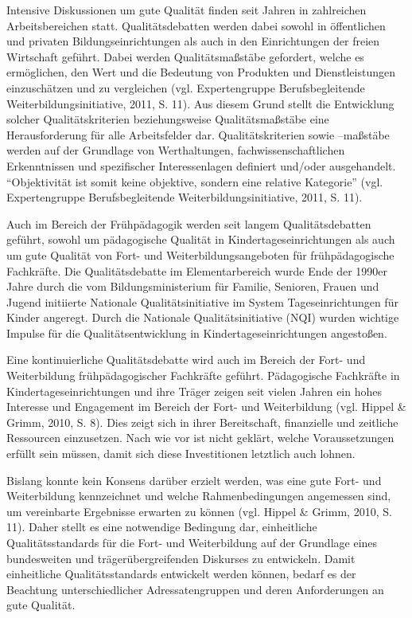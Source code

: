 \documentclass[12pt,a4paper]{article}
\begin{document}
Intensive Diskussionen um gute Qualität finden seit Jahren in zahlreichen Arbeitsbereichen statt. Qualitätsdebatten werden dabei sowohl in öffentlichen und privaten Bildungseinrichtungen als auch in den Einrichtungen der freien Wirtschaft geführt. Dabei werden Qualitätsmaßstäbe gefordert, welche es ermöglichen, den Wert und die Bedeutung von Produkten und Dienstleistungen einzuschätzen und zu vergleichen (vgl. Expertengruppe Berufsbegleitende Weiterbildungsinitiative, 2011, S. 11). Aus diesem Grund stellt die Entwicklung solcher Qualitätskriterien beziehungsweise Qualitätsmaßstäbe eine Herausforderung für alle Arbeitsfelder dar. Qualitätskriterien sowie –maßstäbe werden auf der Grundlage von Werthaltungen, fachwissenschaftlichen Erkenntnissen und spezifischer Interessenlagen definiert und/oder ausgehandelt. "`Objektivität ist somit keine objektive, sondern eine relative Kategorie"' (vgl. Expertengruppe Berufsbegleitende Weiterbildungsinitiative, 2011, S. 11). 

	Auch im Bereich der Frühpädagogik werden seit langem Qualitätsdebatten geführt, sowohl um pädagogische Qualität in Kindertageseinrichtungen als auch um gute Qualität von Fort- und Weiterbildungsangeboten für früh\-pä\-da\-go\-gische Fachkräfte. Die Qualitätsdebatte im Elementarbereich wurde Ende der 1990er Jahre  durch die vom Bildungsministerium für Familie, Senioren, Frauen und Jugend initiierte Nationale Qualitätsinitiative im System Tageseinrichtungen für Kinder angeregt. Durch die Nationale Qualitätsinitiative (NQI) wurden wichtige Impulse für die Qualitätsentwicklung in Kindertageseinrichtungen angestoßen. 
	
	Eine kontinuierliche Qualitätsdebatte wird auch im Bereich der Fort- und Weiterbildung frühpädagogischer Fachkräfte geführt. Pädagogische Fach\-kräf\-te in Kindertageseinrichtungen und ihre Träger zeigen seit vielen Jahren ein hohes Interesse und Engagement im Bereich der Fort- und Weiterbildung (vgl. Hippel \& Grimm, 2010, S. 8). Dies zeigt sich in ihrer Bereitschaft, finanzielle und zeitliche Ressourcen einzusetzen. Nach wie vor ist nicht geklärt, welche Voraussetzungen erfüllt sein müssen, damit sich diese Investitionen letztlich auch lohnen.
	
	Bislang konnte kein Konsens darüber erzielt werden, was eine gute Fort- und Weiterbildung kennzeichnet und welche Rahmenbedingungen angemessen sind, um vereinbarte Ergebnisse erwarten zu können (vgl. Hippel \& Grimm, 2010, S. 11). Daher stellt es eine notwendige Bedingung dar, einheitliche Qualitätsstandards für die Fort- und Weiterbildung auf der Grundlage eines bundesweiten und trägerübergreifenden Diskurses zu entwickeln. Damit einheitliche Qualitätsstandards entwickelt werden können, bedarf es der Beachtung unterschiedlicher Adressatengruppen und deren Anforderungen an gute Qualität.
\end{document}
